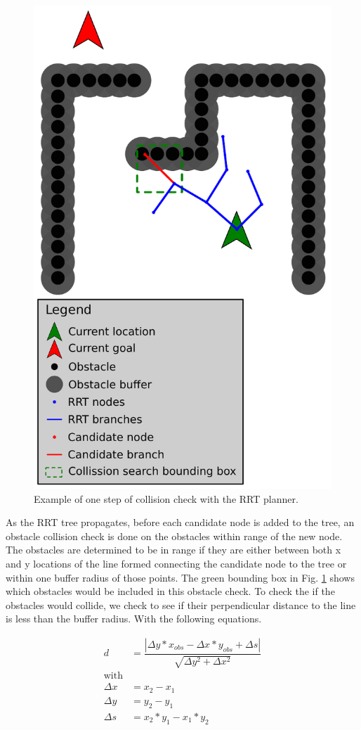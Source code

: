 \documentclass[letterpaper, 10 pt, conference]{ieeeconf}  %
\begin{document}
\begin{figure}
\centering
\includegraphics[width=0.8\linewidth]{rrt_sample}
\caption{Example of one step of collision check with the RRT planner.}
\label{fig:rrt_sample}
\end{figure}

As the RRT tree propagates, before each candidate node is added to the tree, an obstacle collision check is done on the obstacles within range of the new node. The obstacles are determined to be in range if they are either between both x and y locations of the line formed connecting the candidate node to the tree or within one buffer radius of those points. The green bounding box in Fig. \ref{fig:rrt_sample} shows which obstacles would be included in this obstacle check. To check the if the obstacles would collide, we check to see if their perpendicular distance to the line is less than the buffer radius. With the following equations.

\begin{align}
  d &= \dfrac{|\Delta y*x_{\mathit{obs}} -
      \Delta x*y_{\mathit{obs}} + \Delta s|}
      {\sqrt{\Delta y^2 + \Delta x^2}}\\
  \text{with}\\ \nonumber
  \Delta x &= x_2 - x_1\\
  \Delta y &= y_2 - y_1\\
  \Delta s &= x_2*y_1 -x_1*y_2
\end{align}
\end{document}
